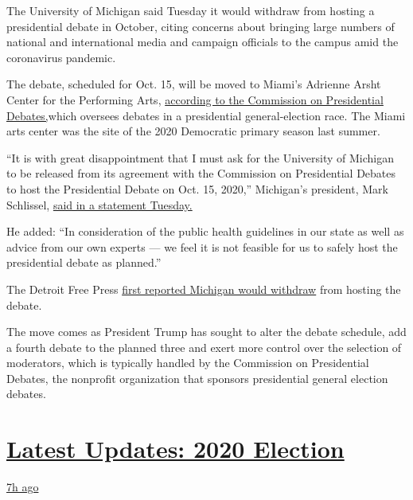 The University of Michigan said Tuesday it would withdraw from hosting a
presidential debate in October, citing concerns about bringing large
numbers of national and international media and campaign officials to
the campus amid the coronavirus pandemic.

The debate, scheduled for Oct. 15, will be moved to Miami's Adrienne
Arsht Center for the Performing Arts,
\href{https://www.debates.org/2020/06/23/statement-second-presidential-debate/}{according
to the Commission on Presidential Debates,}which oversees debates in a
presidential general-election race. The Miami arts center was the site
of the 2020 Democratic primary season last summer.

``It is with great disappointment that I must ask for the University of
Michigan to be released from its agreement with the Commission on
Presidential Debates to host the Presidential Debate on Oct. 15, 2020,''
Michigan's president, Mark Schlissel,
\href{https://record.umich.edu/articles/u-m-no-longer-hosting-oct-15-presidential-debate/}{said
in a statement Tuesday.}

He added: ``In consideration of the public health guidelines in our
state as well as advice from our own experts --- we feel it is not
feasible for us to safely host the presidential debate as planned.''

The Detroit Free Press
\href{https://www.freep.com/story/news/education/2020/06/22/u-m-withdraw-hosting-october-presidential-debate/3239836001/}{first
reported Michigan would withdraw} from hosting the debate.

The move comes as President Trump has sought to alter the debate
schedule, add a fourth debate to the planned three and exert more
control over the selection of moderators, which is typically handled by
the Commission on Presidential Debates, the nonprofit organization that
sponsors presidential general election debates.

\hypertarget{latest-updates-2020-election}{%
\section{\texorpdfstring{\href{https://www.nytimes3xbfgragh.onion/live/2020/08/19/us/dnc-convention-election?action=click\&pgtype=Article\&state=default\&region=MAIN_CONTENT_1\&context=storylines_live_updates}{Latest
Updates: 2020
Election}}{Latest Updates: 2020 Election}}\label{latest-updates-2020-election}}

\href{https://www.nytimes3xbfgragh.onion/live/2020/08/19/us/dnc-convention-election?action=click\&pgtype=Article\&state=default\&region=MAIN_CONTENT_1\&context=storylines_live_updates\#night-3-featured-more-policy-a-focus-on-women-and-a-full-throated-rejection-of-trump-by-his-predecessor}{7h
ago}

